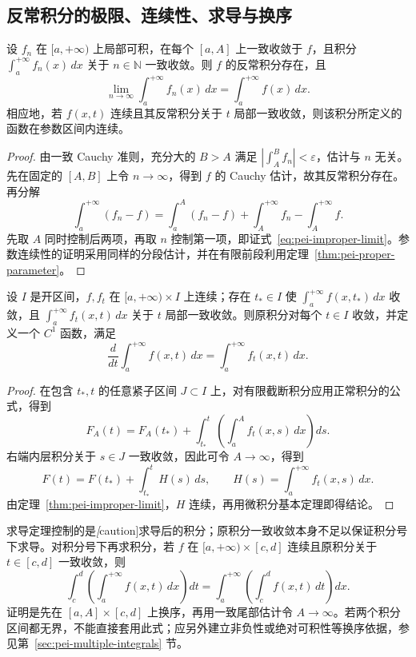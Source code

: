 \subsection{反常积分的极限、连续性、求导与换序}

\begin{theorem}
\label{thm:pei-improper-limit}
设 $f_n$ 在 $[a,+\infty)$ 上局部可积，在每个 $[a,A]$ 上一致收敛于 $f$，且积分 $\int_a^{+\infty}f_n(x)\,dx$ 关于 $n\in\mathbb N$ 一致收敛。则 $f$ 的反常积分存在，且
\begin{equation}
\label{eq:pei-improper-limit}
\lim_{n\to\infty}\int_a^{+\infty}f_n(x)\,dx
=\int_a^{+\infty}f(x)\,dx.
\end{equation}
相应地，若 $f(x,t)$ 连续且其反常积分关于 $t$ 局部一致收敛，则该积分所定义的函数在参数区间内连续。
\end{theorem}
\begin{proof}
由一致 Cauchy 准则，充分大的 $B>A$ 满足 $|\int_A^B f_n|<\varepsilon$，估计与 $n$ 无关。先在固定的 $[A,B]$ 上令 $n\to\infty$，得到 $f$ 的 Cauchy 估计，故其反常积分存在。再分解
\[
\int_a^{+\infty}(f_n-f)
=\int_a^A(f_n-f)+\int_A^{+\infty}f_n-\int_A^{+\infty}f.
\]
先取 $A$ 同时控制后两项，再取 $n$ 控制第一项，即证式~\eqref{eq:pei-improper-limit}。参数连续性的证明采用同样的分段估计，并在有限前段利用定理~\ref{thm:pei-proper-parameter}。
\end{proof}

\begin{theorem}
\label{thm:pei-improper-differentiation}
设 $I$ 是开区间，$f,f_t$ 在 $[a,+\infty)\times I$ 上连续；存在 $t_*\in I$ 使 $\int_a^{+\infty}f(x,t_*)\,dx$ 收敛，且 $\int_a^{+\infty}f_t(x,t)\,dx$ 关于 $t$ 局部一致收敛。则原积分对每个 $t\in I$ 收敛，并定义一个 $C^1$ 函数，满足
\begin{equation}
\label{eq:pei-improper-differentiation}
\frac{d}{dt}\int_a^{+\infty}f(x,t)\,dx
=\int_a^{+\infty}f_t(x,t)\,dx.
\end{equation}
\end{theorem}
\begin{proof}
在包含 $t_*,t$ 的任意紧子区间 $J\subset I$ 上，对有限截断积分应用正常积分的公式，得到
\[
F_A(t)=F_A(t_*)+\int_{t_*}^t\left(\int_a^A f_t(x,s)\,dx\right)ds.
\]
右端内层积分关于 $s\in J$ 一致收敛，因此可令 $A\to\infty$，得到
\[
F(t)=F(t_*)+\int_{t_*}^t H(s)\,ds,
\qquad H(s)=\int_a^{+\infty}f_t(x,s)\,dx.
\]
由定理~\ref{thm:pei-improper-limit}，$H$ 连续，再用微积分基本定理即得结论。
\end{proof}

求导定理控制的是\emph[caution]{求导后的积分}；原积分一致收敛本身不足以保证积分号下求导。对积分号下再求积分，若 $f$ 在 $[a,+\infty)\times[c,d]$ 连续且原积分关于 $t\in[c,d]$ 一致收敛，则
\begin{equation}
\label{eq:pei-improper-parameter-interchange}
\int_c^d\!\left(\int_a^{+\infty}f(x,t)\,dx\right)dt
=\int_a^{+\infty}\!\left(\int_c^d f(x,t)\,dt\right)dx.
\end{equation}
证明是先在 $[a,A]\times[c,d]$ 上换序，再用一致尾部估计令 $A\to\infty$。若两个积分区间都无界，不能直接套用此式；应另外建立非负性或绝对可积性等换序依据，参见第~\ref{sec:pei-multiple-integrals} 节。

